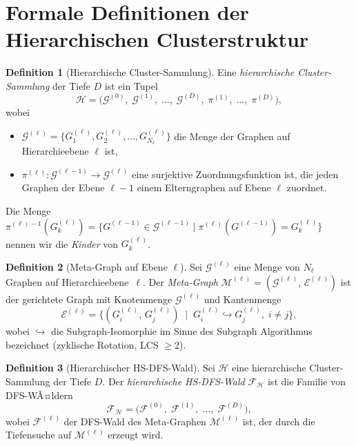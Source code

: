 ﻿\documentclass[a4paper,12pt]{report}
\theoremstyle{definition}
\newtheorem{definition}{Definition}
\begin{document}
\section{Formale Definitionen der Hierarchischen Clusterstruktur}
\label{ssec:hsdfs_defs}

\begin{definition}[Hierarchische Cluster-Sammlung]
\label{def:hier_kollektion}
Eine \emph{hierarchische Cluster-Sammlung} der Tiefe $D$ ist ein Tupel
\[
\mathcal{H} = \bigl(\mathcal{G}^{(0)},\; \mathcal{G}^{(1)},\; \ldots,\; \mathcal{G}^{(D)},\;
                     \pi^{(1)},\; \ldots,\; \pi^{(D)}\bigr),
\]
wobei
\begin{itemize}
    \item $\mathcal{G}^{(\ell)} = \{G^{(\ell)}_1, G^{(\ell)}_2, \ldots, G^{(\ell)}_{N_\ell}\}$ die Menge der Graphen auf Hierarchieebene $\ell$ ist,
    \item $\pi^{(\ell)}: \mathcal{G}^{(\ell-1)} \to \mathcal{G}^{(\ell)}$ eine surjektive Zuordnungsfunktion ist, die jeden Graphen der Ebene $\ell{-}1$ einem Elterngraphen auf Ebene $\ell$ zuordnet.
\end{itemize}
Die Menge $\pi^{(\ell)-1}(G^{(\ell)}_k) = \{G^{(\ell-1)} \in \mathcal{G}^{(\ell-1)} \mid \pi^{(\ell)}(G^{(\ell-1)}) = G^{(\ell)}_k\}$ nennen wir die \emph{Kinder} von $G^{(\ell)}_k$.
\end{definition}

\begin{definition}[Meta-Graph auf Ebene $\ell$]
\label{def:meta_graph_l}
Sei $\mathcal{G}^{(\ell)}$ eine Menge von $N_\ell$ Graphen auf Hierarchieebene~$\ell$.
Der \emph{Meta-Graph} $\mathcal{M}^{(\ell)} = (\mathcal{G}^{(\ell)},\, \mathcal{E}^{(\ell)})$ ist der gerichtete Graph mit Knotenmenge $\mathcal{G}^{(\ell)}$ und Kantenmenge
\[
\mathcal{E}^{(\ell)} = \bigl\{(G^{(\ell)}_i,\, G^{(\ell)}_j) \;\mid\;
G^{(\ell)}_i \hookrightarrow G^{(\ell)}_j,\; i \neq j \bigr\},
\]
wobei $\hookrightarrow$ die Subgraph-Isomorphie im Sinne des Subgraph Algorithmus bezeichnet (zyklische Rotation, LCS $\geq 2$).
\end{definition}

\begin{definition}[Hierarchischer HS-DFS-Wald]
\label{def:hsdfs_wald}
Sei $\mathcal{H}$ eine hierarchische Cluster-Sammlung der Tiefe $D$.
Der \emph{hierarchische HS-DFS-Wald} $\mathcal{F}_\mathcal{H}$ ist die Familie von DFS-WÃ¤ldern
\[
\mathcal{F}_\mathcal{H} = \bigl(\mathcal{F}^{(0)},\; \mathcal{F}^{(1)},\; \ldots,\; \mathcal{F}^{(D)}\bigr),
\]
wobei $\mathcal{F}^{(\ell)}$ der DFS-Wald des Meta-Graphen $\mathcal{M}^{(\ell)}$ ist, der durch die Tiefensuche auf $\mathcal{M}^{(\ell)}$ erzeugt wird.
\end{definition}
\end{document}
